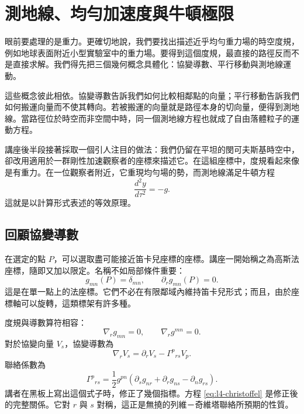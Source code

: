 \chapter{測地線、均勻加速度與牛頓極限}

眼前要處理的是重力。更確切地說，我們要找出描述近乎均勻重力場的時空度規，例如地球表面附近小型實驗室中的重力場。要得到這個度規，最直接的路徑反而不是直接求解。我們得先把三個幾何概念具體化：協變導數、平行移動與測地線運動。

這些概念彼此相依。協變導數告訴我們如何比較相鄰點的向量；平行移動告訴我們如何搬運向量而不使其轉向。若被搬運的向量就是路徑本身的切向量，便得到測地線。當路徑位於時空而非空間中時，同一個測地線方程也就成了自由落體粒子的運動方程。

講座後半段接著採取一個引人注目的做法：我們仍留在平坦的閔可夫斯基時空中，卻改用適用於一群剛性加速觀察者的座標來描述它。在這組座標中，度規看起來像是有重力。在一位觀察者附近，它重現均勻場的勢，而測地線滿足牛頓方程
\begin{equation}
\frac{d^2y}{d\tau^2}=-g.
\end{equation}
這就是以計算形式表述的等效原理。

\section{回顧協變導數}

在選定的點 \(P\)，可以選取盡可能接近笛卡兒座標的座標。講座一開始稱之為高斯法座標，隨即又加以限定。名稱不如局部條件重要：
\begin{equation}
g_{mn}(P)=\delta_{mn},
\qquad
\partial_r g_{mn}(P)=0.
\label{eq:l4-normal-point}
\end{equation}
這是在單一點上的法座標。它們不必在有限鄰域內維持笛卡兒形式；而且，由於座標軸可以旋轉，這類標架有許多種。

度規與導數算符相容：
\begin{equation}
\nabla_r g_{mn}=0,
\qquad
\nabla_r g^{mn}=0.
\label{eq:l4-metric-compatibility}
\end{equation}
對於協變向量 \(V_s\)，協變導數為
\begin{equation}
\nabla_r V_s
=
\partial_r V_s-\Gamma^p{}_{rs}V_p.
\label{eq:l4-covector-derivative}
\end{equation}
聯絡係數為
\begin{equation}
\Gamma^p{}_{rs}
=
\frac{1}{2}g^{pn}
\left(
\partial_s g_{nr}
+\partial_r g_{ns}
-\partial_n g_{rs}
\right).
\label{eq:l4-christoffel}
\end{equation}
講者在黑板上寫出這個式子時，修正了幾個指標。方程 \eqref{eq:l4-christoffel} 是修正後的完整關係。它對 \(r\) 與 \(s\) 對稱，這正是無撓的列維－奇維塔聯絡所預期的性質。

